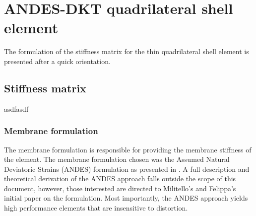 




\setcounter{MaxMatrixCols}{20}


\chapter{ANDES-DKT quadrilateral shell element}

\renewcommand{\Thema}{ANDES-DKT quadrilateral shell element}

The formulation of the stiffness matrix for the thin quadrilateral shell element is presented after a quick orientation.

\section{Stiffness matrix}

asdfasdf



\subsection{Membrane formulation}

The membrane formulation is responsible for providing the membrane stiffness of the element. The membrane formulation chosen was the Assumed Natural Deviatoric Strains (ANDES) formulation as presented in \cite{Hau94}. A full description and theoretical derivation of the ANDES approach falls outside the scope of this document, however, those interested are directed to Militello's and Felippa's initial paper \cite{Fel91} on the formulation. Most importantly, the ANDES approach yields high performance elements that are insensitive to distortion.\\


